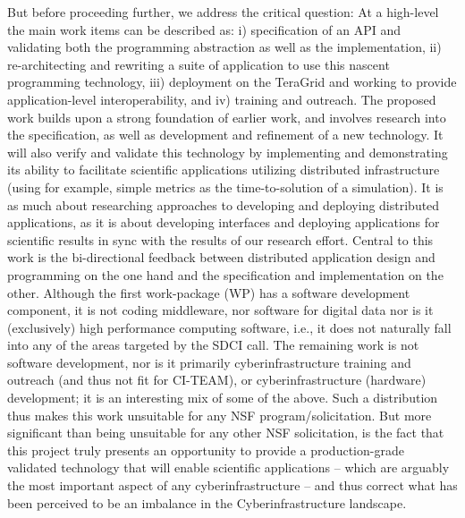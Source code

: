 \documentclass[10pt,letterpaper]{article}
\begin{document}
But before proceeding further, we address the critical question:
 At a high-level the main work items can be described
as: i) specification of an API and validating both the programming
abstraction as well as the implementation, ii) re-architecting and
rewriting a suite of application to use this nascent programming
technology, iii) deployment on the TeraGrid and working to provide
application-level interoperability, and iv) training and outreach.
The proposed work builds upon a strong foundation of earlier work, and
involves research into the specification, as well as development and
refinement of a new technology.  It will also verify and validate this
technology by implementing and demonstrating its ability to facilitate
scientific applications utilizing distributed infrastructure (using
for example, simple metrics as the time-to-solution of a simulation).
It is as much about researching approaches to developing and deploying
distributed applications, as it is about developing interfaces and
deploying applications for scientific results in sync with the results
of our research effort.  Central to this work is the bi-directional
feedback between distributed application design and programming on the
one hand and the specification and implementation on the other.
Although the first work-package (WP)
has a software development component, it is not coding middleware, nor
software for digital data nor is it (exclusively) high performance
computing software, i.e., it does not naturally fall into any of the
areas targeted by the SDCI call.  The remaining work is not software
development, nor is it primarily cyberinfrastructure training and
outreach (and thus not fit for CI-TEAM), or cyberinfrastructure
(hardware) development; it is an interesting mix of some of the above.
Such a distribution thus makes this work unsuitable for any 
 NSF program/solicitation. But more significant than being
unsuitable for any other NSF solicitation, is the fact that this
project truly presents an opportunity to provide a production-grade
validated technology that will enable scientific applications -- which
are arguably the most important aspect of any cyberinfrastructure --
and thus correct what has been perceived to be an imbalance in the
Cyberinfrastructure landscape.

\end{document}
